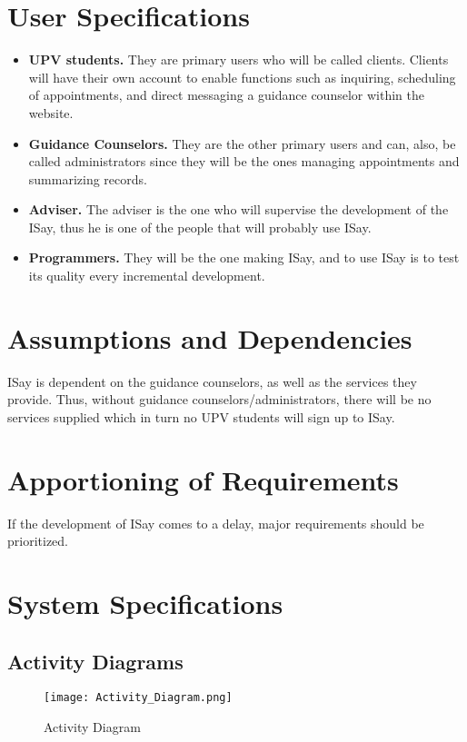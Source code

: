 \section{User Specifications}
	\begin{itemize}
	\item \textbf{UPV students.} They are primary users who will be called clients. Clients will have their own account to enable functions such as inquiring, scheduling of appointments, and direct messaging a guidance counselor within the website. 
	\item \textbf{Guidance Counselors.} They are the other primary users and can, also, be called administrators since they will be the ones managing appointments and summarizing records. 
	\item \textbf{Adviser.} The adviser is the one who will supervise the development of the ISay, thus he is one of the people that will probably use ISay. 
	\item \textbf{Programmers.} They will be the one making ISay, and to use ISay is to test its quality every incremental development. 
	\end{itemize}

\section{Assumptions and Dependencies}
ISay is dependent on the guidance counselors, as well as the services they provide. Thus, without guidance counselors/administrators, there will be no services supplied which in turn no UPV students will sign up to ISay. 

\section{Apportioning of Requirements}
If the development of ISay comes to a delay, major requirements should be prioritized. 

\section{System Specifications}

\newpage
\subsection{Activity Diagrams}

\begin{figure}[h!]                %
\centering                    %
\texttt{[image: Activity\_Diagram.png]}     
\caption{Activity Diagram}
\label{fig:activitydiagram}
\end{figure}

